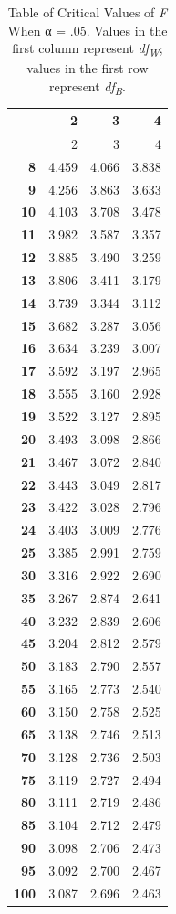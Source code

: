 \documentclass[
]{krantz}
\begin{document}
\begin{longtable}[]{@{}rrrr@{}}
\caption{\label{tab:fcrit} Table of Critical Values of \emph{F} When α = .05. Values in the first column represent \emph{df\textsubscript{W}}; values in the first row represent \emph{df\textsubscript{B}}.}\tabularnewline
\toprule\noalign{}
& 2 & 3 & 4 \\
\midrule\noalign{}
\endfirsthead
\toprule\noalign{}
& 2 & 3 & 4 \\
\midrule\noalign{}
\endhead
\bottomrule\noalign{}
\endlastfoot
\textbf{8} & 4.459 & 4.066 & 3.838 \\
\textbf{9} & 4.256 & 3.863 & 3.633 \\
\textbf{10} & 4.103 & 3.708 & 3.478 \\
\textbf{11} & 3.982 & 3.587 & 3.357 \\
\textbf{12} & 3.885 & 3.490 & 3.259 \\
\textbf{13} & 3.806 & 3.411 & 3.179 \\
\textbf{14} & 3.739 & 3.344 & 3.112 \\
\textbf{15} & 3.682 & 3.287 & 3.056 \\
\textbf{16} & 3.634 & 3.239 & 3.007 \\
\textbf{17} & 3.592 & 3.197 & 2.965 \\
\textbf{18} & 3.555 & 3.160 & 2.928 \\
\textbf{19} & 3.522 & 3.127 & 2.895 \\
\textbf{20} & 3.493 & 3.098 & 2.866 \\
\textbf{21} & 3.467 & 3.072 & 2.840 \\
\textbf{22} & 3.443 & 3.049 & 2.817 \\
\textbf{23} & 3.422 & 3.028 & 2.796 \\
\textbf{24} & 3.403 & 3.009 & 2.776 \\
\textbf{25} & 3.385 & 2.991 & 2.759 \\
\textbf{30} & 3.316 & 2.922 & 2.690 \\
\textbf{35} & 3.267 & 2.874 & 2.641 \\
\textbf{40} & 3.232 & 2.839 & 2.606 \\
\textbf{45} & 3.204 & 2.812 & 2.579 \\
\textbf{50} & 3.183 & 2.790 & 2.557 \\
\textbf{55} & 3.165 & 2.773 & 2.540 \\
\textbf{60} & 3.150 & 2.758 & 2.525 \\
\textbf{65} & 3.138 & 2.746 & 2.513 \\
\textbf{70} & 3.128 & 2.736 & 2.503 \\
\textbf{75} & 3.119 & 2.727 & 2.494 \\
\textbf{80} & 3.111 & 2.719 & 2.486 \\
\textbf{85} & 3.104 & 2.712 & 2.479 \\
\textbf{90} & 3.098 & 2.706 & 2.473 \\
\textbf{95} & 3.092 & 2.700 & 2.467 \\
\textbf{100} & 3.087 & 2.696 & 2.463 \\
\end{longtable}
\end{document}

